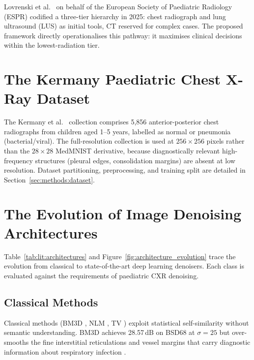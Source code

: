 \documentclass[12pt, a4paper, twoside, openright]{book}
\begin{document}
Lovrenski et al.\ \cite{lovrenski_esr_2025} on behalf of the European Society of Paediatric Radiology (ESPR) codified a three-tier hierarchy in 2025: chest radiograph and lung ultrasound (LUS) as initial tools, CT reserved for complex cases. The proposed framework directly operationalises this pathway: it maximises clinical decisions within the lowest-radiation tier.

\section{The Kermany Paediatric Chest X-Ray Dataset}
\label{sec:lit:kermany}

The Kermany et al.\ \cite{kermany_identifying_2018} collection comprises 5,856 anterior-posterior chest radiographs from children aged 1--5 years, labelled as normal or pneumonia (bacterial/viral). The full-resolution collection is used at $256\times256$ pixels rather than the $28\times28$ MedMNIST \cite{yang_medmnist_2023} derivative, because diagnostically relevant high-frequency structures (pleural edges, consolidation margins) are absent at low resolution. Dataset partitioning, preprocessing, and training split are detailed in Section~\ref{sec:methods:dataset}.

\section{The Evolution of Image Denoising Architectures}
\label{sec:lit:architectures}

Table~\ref{tab:lit:architectures} and Figure~\ref{fig:architecture_evolution} trace the evolution from classical to state-of-the-art deep learning denoisers. Each class is evaluated against the requirements of paediatric CXR denoising.

\subsection{Classical Methods}
\label{sec:lit:architectures:classical}

Classical methods (BM3D \cite{dabov_image_2007}, NLM \cite{buades_non-local_2005}, TV \cite{rudin_nonlinear_1992}) exploit statistical self-similarity without semantic understanding. BM3D achieves 28.57\,dB on BSD68 at $\sigma=25$ but over-smooths the fine interstitial reticulations and vessel margins that carry diagnostic information about respiratory infection \cite{rudin_nonlinear_1992, dabov_image_2007}.
\end{document}
